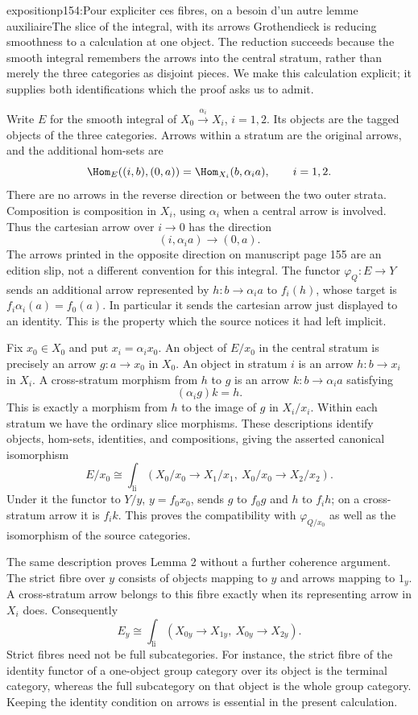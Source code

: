 \begin{dcomment}{exposition}{p154:Pour expliciter ces fibres, on a besoin d'un autre lemme auxiliaire}{The slice of the integral, with its arrows}
Grothendieck is reducing smoothness to a calculation at one object. The reduction succeeds because the smooth integral remembers the arrows into the central stratum, rather than merely the three categories as disjoint pieces. We make this calculation explicit; it supplies both identifications which the proof asks us to admit.

Write $E$ for the smooth integral of $X_0\xrightarrow{\alpha_i}X_i$, $i=1,2$. Its objects are the tagged objects of the three categories. Arrows within a stratum are the original arrows, and the additional hom-sets are
\[
 \Hom_E((i,b),(0,a))=\Hom_{X_i}(b,\alpha_i a),\qquad i=1,2.
\]
There are no arrows in the reverse direction or between the two outer strata. Composition is composition in $X_i$, using $\alpha_i$ when a central arrow is involved. Thus the cartesian arrow over $i\to0$ has the direction
\[
 (i,\alpha_i a)\longrightarrow(0,a).
\]
The arrows printed in the opposite direction on manuscript page 155 are an edition slip, not a different convention for this integral. The functor $\varphi_Q:E\to Y$ sends an additional arrow represented by $h:b\to\alpha_i a$ to $f_i(h)$, whose target is $f_i\alpha_i(a)=f_0(a)$. In particular it sends the cartesian arrow just displayed to an identity. This is the property which the source notices it had left implicit.

Fix $x_0\in X_0$ and put $x_i=\alpha_i x_0$. An object of $E/x_0$ in the central stratum is precisely an arrow $g:a\to x_0$ in $X_0$. An object in stratum $i$ is an arrow $h:b\to x_i$ in $X_i$. A cross-stratum morphism from $h$ to $g$ is an arrow $k:b\to\alpha_i a$ satisfying
\[
       (\alpha_i g)k=h.
\]
This is exactly a morphism from $h$ to the image of $g$ in $X_i/x_i$. Within each stratum we have the ordinary slice morphisms. These descriptions identify objects, hom-sets, identities, and compositions, giving the asserted canonical isomorphism
\[
 E/x_0\cong\int_{\mathrm{li}}
       (X_0/x_0\longrightarrow X_1/x_1,\ X_0/x_0\longrightarrow X_2/x_2).
\]
Under it the functor to $Y/y$, $y=f_0x_0$, sends $g$ to $f_0g$ and $h$ to $f_i h$; on a cross-stratum arrow it is $f_i k$. This proves the compatibility with $\varphi_{Q/x_0}$ as well as the isomorphism of the source categories.

The same description proves Lemma 2 without a further coherence argument. The strict fibre over $y$ consists of objects mapping to $y$ and arrows mapping to $1_y$. A cross-stratum arrow belongs to this fibre exactly when its representing arrow in $X_i$ does. Consequently
\[
 E_y\cong\int_{\mathrm{li}}(X_{0y}\longrightarrow X_{1y},\ X_{0y}\longrightarrow X_{2y}).
\]
Strict fibres need not be full subcategories. For instance, the strict fibre of the identity functor of a one-object group category over its object is the terminal category, whereas the full subcategory on that object is the whole group category. Keeping the identity condition on arrows is essential in the present calculation.


\end{dcomment}
